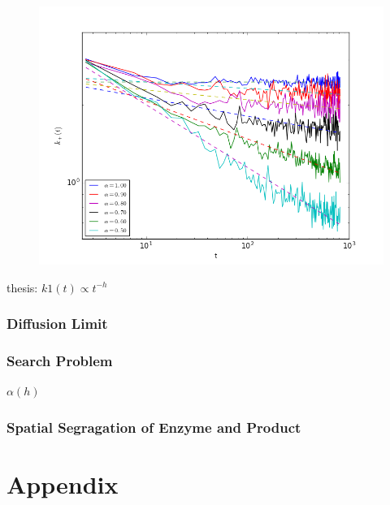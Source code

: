 \documentclass[
  a4paper,BCOR10mm,oneside,
  bibtotoc,idxtotoc,
  headsepline,footsepline,%
  fleqn,openbib
]{scrbook}
\begin{document}
\begin{figure}[h!]
  \centering
  \includegraphics[width=\textwidth]{./data/k1_fordifferentalpha_withfit.png}
  \captionsetup{width=\linewidth}
  \label{fig:k1differentalphawithfit}
\end{figure}


thesis: $k1(t)\propto t^{-h}$
\subsection{Diffusion Limit}
\subsection{Search Problem}
$\alpha(h)$
\subsection{Spatial Segragation of Enzyme and Product}



\chapter{Appendix}
\end{document}
